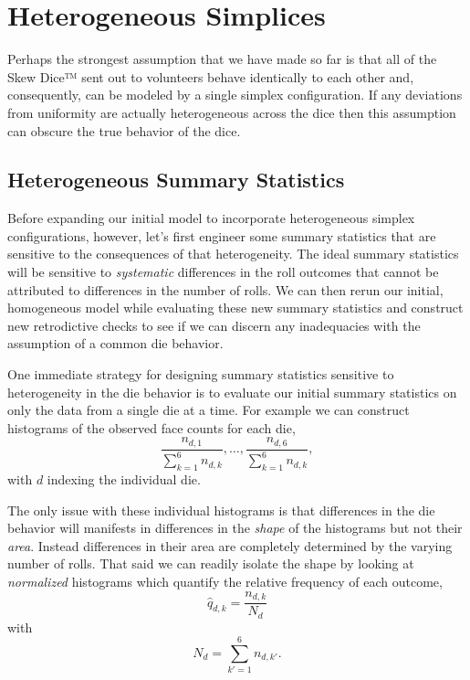 \documentclass[
  letterpaper,
  DIV=11,
  numbers=noendperiod]{scrartcl}
\begin{document}
\section{Heterogeneous Simplices}\label{heterogeneous-simplices}

Perhaps the strongest assumption that we have made so far is that all of
the Skew Dice™ sent out to volunteers behave identically to each other
and, consequently, can be modeled by a single simplex configuration. If
any deviations from uniformity are actually heterogeneous across the
dice then this assumption can obscure the true behavior of the dice.

\subsection{Heterogeneous Summary
Statistics}\label{heterogeneous-summary-statistics}

Before expanding our initial model to incorporate heterogeneous simplex
configurations, however, let's first engineer some summary statistics
that are sensitive to the consequences of that heterogeneity. The ideal
summary statistics will be sensitive to \emph{systematic} differences in
the roll outcomes that cannot be attributed to differences in the number
of rolls. We can then rerun our initial, homogeneous model while
evaluating these new summary statistics and construct new retrodictive
checks to see if we can discern any inadequacies with the assumption of
a common die behavior.

One immediate strategy for designing summary statistics sensitive to
heterogeneity in the die behavior is to evaluate our initial summary
statistics on only the data from a single die at a time. For example we
can construct histograms of the observed face counts for each die, \[
\frac{ n_{d, 1} }{ \sum_{k = 1}^{6} n_{d, k} }, \ldots,
\frac{ n_{d, 6} }{ \sum_{k = 1}^{6} n_{d, k} },
\] with \(d\) indexing the individual die.

The only issue with these individual histograms is that differences in
the die behavior will manifests in differences in the \emph{shape} of
the histograms but not their \emph{area}. Instead differences in their
area are completely determined by the varying number of rolls. That said
we can readily isolate the shape by looking at \emph{normalized}
histograms which quantify the relative frequency of each outcome, \[
\hat{q}_{d, k} = \frac{ n_{d, k} }{ N_{d} }
\] with \[
N_{d} = \sum_{k' = 1}^{6} n_{d, k'}.
\]
\end{document}
